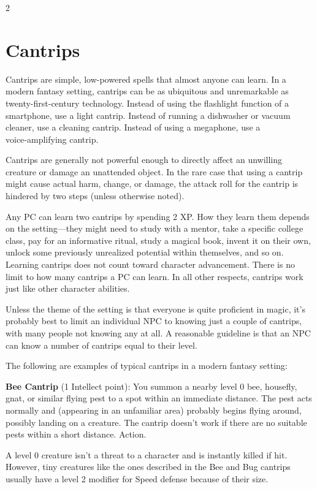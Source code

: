 \begin{multicols}{2}

\chapter{Cantrips}

Cantrips are simple, low-powered spells that almost anyone can learn. In a modern fantasy setting, cantrips can be as ubiquitous and unremarkable as twenty-first-century technology. Instead of using the flashlight function of a smartphone, use a light cantrip. Instead of running a dishwasher or vacuum cleaner, use a cleaning cantrip. Instead of using a megaphone, use a voice‑amplifying cantrip. 

Cantrips are generally not powerful enough to directly affect an unwilling creature or damage an unattended object. In the rare case that using a cantrip might cause actual harm, change, or damage, the attack roll for the cantrip is hindered by two steps (unless otherwise noted). 

Any PC can learn two cantrips by spending 2 XP. How they learn them depends on the setting—they might need to study with a mentor, take a specific college class, pay for an informative ritual, study a magical book, invent it on their own, unlock some previously unrealized potential within themselves, and so on. Learning cantrips does not count toward character advancement. There is no limit to how many cantrips a PC can learn. In all other respects, cantrips work just like other character abilities. 

Unless the theme of the setting is that everyone is quite proficient in magic, it’s probably best to limit an individual NPC to knowing just a couple of cantrips, with many people not knowing any at all. A reasonable guideline is that an NPC can know a number of cantrips equal to their level.

The following are examples of typical cantrips in a modern fantasy setting:

\textbf{Bee Cantrip} (1 Intellect point): You summon a nearby level 0 bee, housefly, gnat, or similar flying pest to a spot within an immediate distance. The pest acts normally and (appearing in an unfamiliar area) probably begins flying around, possibly landing on a creature. The cantrip doesn’t work if there are no suitable pests within a short distance. Action. 

A level 0 creature isn’t a threat to a character and is instantly killed if hit. However, tiny creatures like the ones described in the Bee and Bug cantrips usually have a level 2 modifier for Speed defense because of their size.


\end{multicols}
